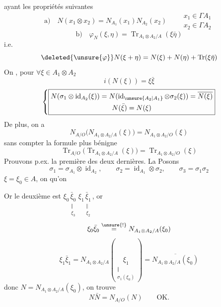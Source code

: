 ayant les propriétés suivantes
\[
\text{a)}\quad N(x_1\otimes x_2)=N_{A_1}(x_1)N_{A_2}(x_2)
\qquad\begin{gathered}x_1\in\Gamma A_1\\x_2\in\Gamma A_2\end{gathered}
\]
\[
\text{b)}\quad \varphi_N(\xi,\eta)=\operatorname{Tr}_{A_1\otimes A_2/A}(\xi\bar\eta)
\]
i.e.
\[
 \deleted{\unsure{\varphi}}N(\xi+\eta)=N(\xi)+N(\eta)+\operatorname{Tr}(\xi\bar\eta)
\]
On , pour $\forall\xi\in A_1\otimes A_2$
\[
 \boxed{i(N(\xi))=\xi\bar\xi}
\]
\[
\left\{\boxed{\begin{gathered}
 N(\sigma_1\otimes\operatorname{id}_{A_2}(\xi))=N(\operatorname{id}_{\unsure{A_2|A_1}}\otimes\sigma_2(\xi))=\overline{N(\xi)}\\
 N(\bar\xi)=N(\xi)
\end{gathered}}\right.
\]
De plus, on a
\[
 \boxed{N_{A/O}\bigl(N_{A_1\otimes A_2/A}(\xi)\bigr)=N_{A_1\otimes A_2/O}(\xi)}
\]
sans compter la formule plus bénigne
\[
 \boxed{\operatorname{Tr}_{A/O}\bigl(\operatorname{Tr}_{A_1\otimes A_2/A}(\xi)\bigr)=\operatorname{Tr}_{A_1\otimes A_2/O}(\xi)}
\]
Prouvons p.ex. la première des deux dernières. La 
Posons
\[
 \sigma_1=\sigma_{A_1}\otimes\operatorname{id}_{A_2},\qquad
 \sigma_2=\operatorname{id}_{A_1}\otimes\sigma_2,
 \qquad\sigma_3=\sigma_1\sigma_2
\]
\deleted{\unsure{\xi}} $\xi=\xi_0\in A$, 
on  qu'on 

Or le deuxième est $\xi_0\underset{\substack{\Vert\\\xi_3}}{\bar\xi_0}\,\xi_1\underset{\substack{\Vert\\\xi_2}}{\bar\xi_1}$, or
\[
 \xi_0\bar\xi_0\overset{\unsure{!}}{=}N_{A_1\otimes A_2/A}(\xi_0)
\]
\[
 \xi_1\bar\xi_1=N_{A_1\otimes A_2/A}\left(\underset{\substack{\Vert\\\sigma_1(\xi_0)}}{\xi_1}\right)
 =\overline{N_{A_1\otimes A_2/A}(\xi_0)}
\]
donc  $N=N_{A_1\otimes A_2/A}(\xi_0)$, on trouve
\[
 N\bar N=N_{A/O}(N)\qquad\text{OK}.
\]


